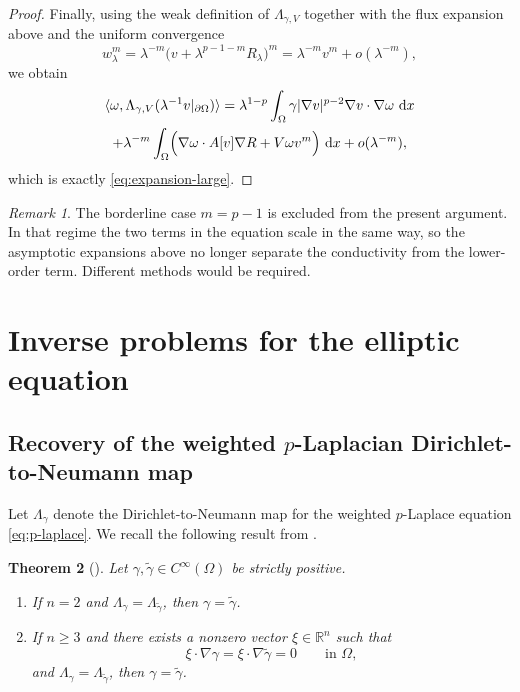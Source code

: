 \documentclass[a4paper,12pt]{article}
\newcommand{\la}{\langle}
\newcommand{\ra}{\rangle}
\newcommand{\pr}{\partial}
\newcommand{\R}{\mathbb{R}}
\newcommand{\dd}{\,\mathrm{d}}
\newtheorem{thm}{Theorem}[section]
\theoremstyle{definition}
\theoremstyle{remark}
\newtheorem{rem}[thm]{Remark}
\begin{document}
\begin{proof}
Finally, using the weak definition of $\Lambda_{\gamma,V}$ together with the flux expansion above and the uniform convergence
\[
w_\lambda^m=\lambda^{-m}\bigl(v+\lambda^{p-1-m}R_\lambda\bigr)^m
=\lambda^{-m}v^m+o(\lambda^{-m}),
\]
we obtain
\begin{multline*}
\la\omega,\Lambda_{\gamma,V}(\lambda^{-1}v|_{\pr\Omega})\ra
=\lambda^{1-p}\int_\Omega \gamma|\nabla v|^{p-2}\nabla v\cdot\nabla\omega\,\dd x\\
+\lambda^{-m}\int_\Omega\Bigl(\nabla\omega\cdot A[v]\nabla R+V\omega v^m\Bigr)\,\dd x+o(\lambda^{-m}),
\end{multline*}
which is exactly \eqref{eq:expansion-large}.
\end{proof}

\begin{rem}\label{rem:critical}
The borderline case $m=p-1$ is excluded from the present argument. In that regime the two terms in the equation scale in the same way, so the asymptotic expansions above no longer separate the conductivity from the lower-order term. Different methods would be required.
\end{rem}

\section{Inverse problems for the elliptic equation}\label{sec:inverse-elliptic}

\subsection{Recovery of the weighted $p$-Laplacian Dirichlet-to-Neumann map}

Let $\Lambda_\gamma$ denote the Dirichlet-to-Neumann map for the weighted $p$-Laplace equation \eqref{eq:p-laplace}. We recall the following result from \cite{CarFe3}.

\begin{thm}[\cite{CarFe3}]\label{thm:CarFe}
Let $\gamma,\tilde\gamma\in C^\infty(\Omega)$ be strictly positive.
\begin{enumerate}
\item If $n=2$ and $\Lambda_\gamma=\Lambda_{\tilde\gamma}$, then $\gamma=\tilde\gamma$.
\item If $n\ge 3$ and there exists a nonzero vector $\xi\in\R^n$ such that
\[
\xi\cdot\nabla\gamma=\xi\cdot\nabla\tilde\gamma=0
\qquad \text{in }\Omega,
\]
and $\Lambda_\gamma=\Lambda_{\tilde\gamma}$, then $\gamma=\tilde\gamma$.
\end{enumerate}
\end{thm}
\end{document}
